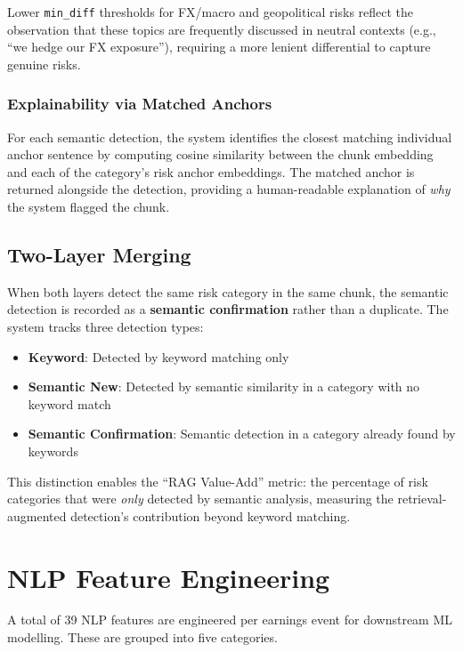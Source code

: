 \documentclass[12pt,a4paper]{article}
\begin{document}
Lower \texttt{min\_diff} thresholds for FX/macro and geopolitical risks reflect the observation that these topics are frequently discussed in neutral contexts (e.g., ``we hedge our FX exposure''), requiring a more lenient differential to capture genuine risks.

\subsubsection{Explainability via Matched Anchors}

For each semantic detection, the system identifies the closest matching individual anchor sentence by computing cosine similarity between the chunk embedding and each of the category's risk anchor embeddings. The matched anchor is returned alongside the detection, providing a human-readable explanation of \emph{why} the system flagged the chunk.

\subsection{Two-Layer Merging}

When both layers detect the same risk category in the same chunk, the semantic detection is recorded as a \textbf{semantic confirmation} rather than a duplicate. The system tracks three detection types:
\begin{itemize}[noitemsep]
    \item \textbf{Keyword}: Detected by keyword matching only
    \item \textbf{Semantic New}: Detected by semantic similarity in a category with no keyword match
    \item \textbf{Semantic Confirmation}: Semantic detection in a category already found by keywords
\end{itemize}

This distinction enables the ``RAG Value-Add'' metric: the percentage of risk categories that were \emph{only} detected by semantic analysis, measuring the retrieval-augmented detection's contribution beyond keyword matching.


\section{NLP Feature Engineering}
\label{sec:features}

A total of 39 NLP features are engineered per earnings event for downstream ML modelling. These are grouped into five categories.
\end{document}
